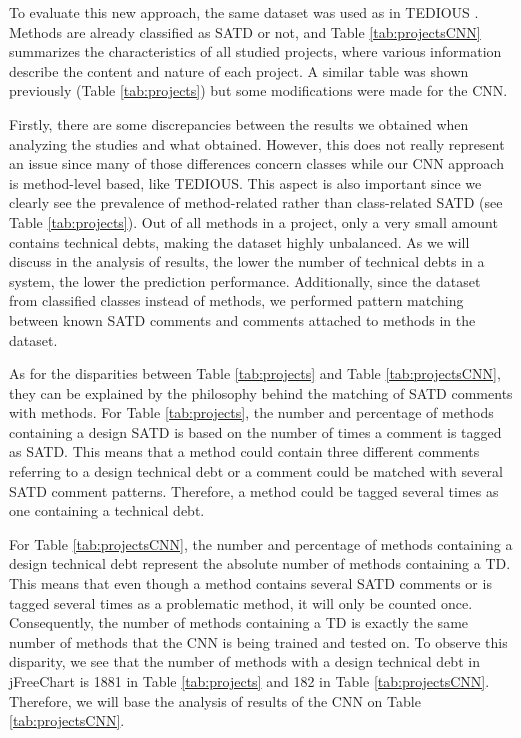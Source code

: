 To evaluate this new approach, the same dataset was used as in TEDIOUS \citep{maldonado17}. Methods are already classified as SATD or not, and Table \ref{tab:projectsCNN} summarizes the characteristics of all studied projects, where various information describe the content and nature of each project. A similar table was shown previously (Table \ref{tab:projects}) but some modifications were made for the CNN.

Firstly, there are some discrepancies between the results we obtained when analyzing the studies and what \citet{maldonado17} obtained. However, this does not really represent an issue since many of those differences concern classes while our CNN approach is method-level based, like TEDIOUS. This aspect is also important since we clearly see the prevalence of method-related rather than class-related SATD (see Table \ref{tab:projects}). Out of all methods in a project, only a very small amount contains technical debts, making the dataset highly unbalanced. As we will discuss in the analysis of results, the lower the number of technical debts in a system, the lower the prediction performance. Additionally, since the dataset from \citet{maldonado17} classified classes instead of methods, we performed pattern matching between known SATD comments and comments attached to methods in the dataset.

As for the disparities between Table \ref{tab:projects} and Table \ref{tab:projectsCNN}, they can be explained by the philosophy behind the matching of SATD comments with methods. For Table \ref{tab:projects}, the number and percentage of methods containing a design SATD is based on the number of times a comment is tagged as SATD. This means that a method could contain three different comments referring to a design technical debt or a comment could be matched with several SATD comment patterns. Therefore, a method could be tagged several times as one containing a technical debt.

For Table \ref{tab:projectsCNN}, the number and percentage of methods containing a design technical debt represent the absolute number of methods containing a TD. This means that even though a method contains several SATD comments or is tagged several times as a problematic method, it will only be counted once. Consequently, the number of methods containing a TD is exactly the same number of methods that the CNN is being trained and tested on. To observe this disparity, we see that the number of methods with a design technical debt in jFreeChart is 1881 in Table \ref{tab:projects} and 182 in Table \ref{tab:projectsCNN}. Therefore, we will base the analysis of results of the CNN on Table \ref{tab:projectsCNN}.

